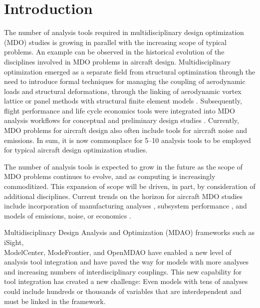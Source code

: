 \section{Introduction}
    \label{s:intro}
    The number of analysis tools required in multidisciplinary design optimization (MDO) studies is growing
    in parallel with the increasing scope of typical problems. An example can
    be observed in the historical evolution of the disciplines involved in MDO problems in aircraft design.
    Multidisciplinary optimization emerged as a separate field from structural optimization through the
    need to introduce formal techniques for managing the coupling of aerodynamic loads and structural
    deformations, through the linking of aerodynamic vortex lattice or panel methods with structural finite
    element models \cite{Cramer1994}. Subsequently, flight performance and life cycle economics tools were integrated
    into MDO analysis workflows for conceptual and preliminary design studies \cite{Sobieski1998}. Currently, MDO
    problems for aircraft design also often include tools for aircraft noise and emissions. In sum, it is now
    commonplace for 5--10 analysis tools to be employed for typical aircraft design optimization studies.

    The number of analysis tools is expected to grow in the future as the scope of MDO problems continues
    to evolve, and as computing is increasingly commoditized. This expansion of scope will be driven, in
    part, by consideration of additional disciplines. Current trends on the horizon for aircraft MDO studies
    include incorporation of manufacturing analyses \cite{deWeck2007}, subsystem performance \cite{Dean2009,Gavel2006}, and models of emissions, noise, or economics \cite{Antoine2004,Rallabhandi2007,Kirby2008}.

    Multidisciplinary Design Analysis and Optimization (MDAO)
    frameworks such as iSight\textsuperscript{\textregistered},\\ ModelCenter\textsuperscript{\textregistered}, ModeFrontier\textsuperscript{\textregistered}, and OpenMDAO\cite{Gray2012} have enabled a new level of analysis tool integration
    and have paved the way for models with more analyses and increasing numbers of interdisciplinary couplings. This
    new capability for tool integration has created a new challenge: Even models with tens of analyses could include hundreds or thousands of variables that are interdependent and must be linked in the framework.

